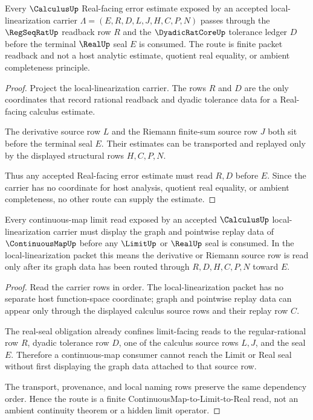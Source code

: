 \begin{theorem}
\label{thm:calculus-regseqrat-dyadic-error-route}
Every $\CalculusUp$ Real-facing error estimate exposed by an accepted local-linearization carrier $\Lambda=(E,R,D,L,J,H,C,P,N)$ passes through the $\RegSeqRatUp$ readback row $R$ and the $\DyadicRatCoreUp$ tolerance ledger $D$ before the terminal $\RealUp$ seal $E$ is consumed. The route is finite packet readback and not a host analytic estimate, quotient real equality, or ambient completeness principle.
\end{theorem}
\begin{proof}
Project the local-linearization carrier. The rows $R$ and $D$ are the only coordinates that record rational readback and dyadic tolerance data for a Real-facing calculus estimate.

The derivative source row $L$ and the Riemann finite-sum source row $J$ both sit before the terminal seal $E$. Their estimates can be transported and replayed only by the displayed structural rows $H,C,P,N$.

Thus any accepted Real-facing error estimate must read $R,D$ before $E$. Since the carrier has no coordinate for host analysis, quotient real equality, or ambient completeness, no other route can supply the estimate.
\end{proof}

\begin{theorem}
\label{thm:calculus-continuousmap-limit-route}
Every continuous-map limit read exposed by an accepted $\CalculusUp$ local-linearization carrier must display the graph and pointwise replay data of $\ContinuousMapUp$ before any $\LimitUp$ or $\RealUp$ seal is consumed. In the local-linearization packet this means the derivative or Riemann source row is read only after its graph data has been routed through $R,D,H,C,P,N$ toward $E$.
\end{theorem}
\begin{proof}
Read the carrier rows in order. The local-linearization packet has no separate host function-space coordinate; graph and pointwise replay data can appear only through the displayed calculus source rows and their replay row $C$.

The real-seal obligation already confines limit-facing reads to the regular-rational row $R$, dyadic tolerance row $D$, one of the calculus source rows $L,J$, and the seal $E$. Therefore a continuous-map consumer cannot reach the Limit or Real seal without first displaying the graph data attached to that source row.

The transport, provenance, and local naming rows preserve the same dependency order. Hence the route is a finite ContinuousMap-to-Limit-to-Real read, not an ambient continuity theorem or a hidden limit operator.
\end{proof}

